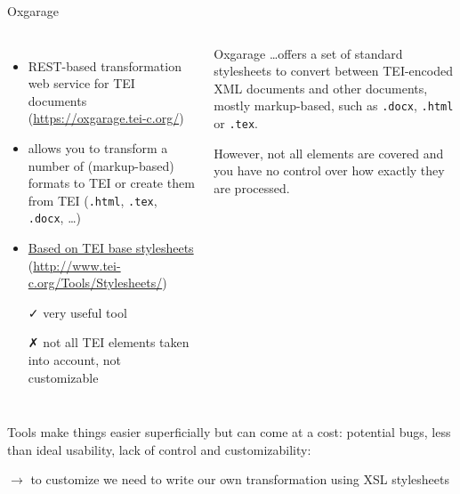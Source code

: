 
\begin{frame}{Oxgarage}
\footnotesize

\begin{columns}
\begin{itemize}
    \item REST-based transformation web service for TEI documents (\protect\url{https://oxgarage.tei-c.org/})
    \item allows you to transform a number of (markup-based) formats to TEI or create them from TEI (\texttt{.html}, \texttt{.tex}, \texttt{.docx}, \dots)
    \item \href{https://tei-c.org/Vault/P5/3.6.0/doc/tei-xsl}{Based on TEI base stylesheets} (\protect\url{http://www.tei-c.org/Tools/Stylesheets/})
    \item[\textcolor{w3schools}{\faCheck}] very useful tool
    \item[\textcolor{alert}{\faClose}] not all TEI elements taken into account, not customizable
\end{itemize}
\begin{block}{Oxgarage}
\dots offers a set of standard stylesheets to convert between TEI-encoded XML documents and other documents, mostly markup-based, such as \texttt{.docx}, \texttt{.html} or \texttt{.tex}. 

However, not all elements are covered and you have no control over how exactly they are processed. 
\end{block}
\end{columns}\medskip

Tools make things easier superficially but can come at a cost: potential bugs, less than ideal usability, lack of control and customizability:

\alert{$\to$ to customize we need to write our own transformation using XSL stylesheets}


\end{frame}




